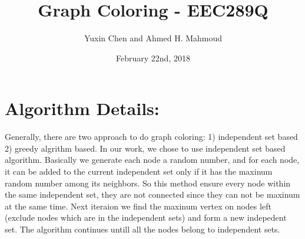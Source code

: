 \documentclass[12pt] {article}
\begin{document}
\title{Graph Coloring -  EEC289Q}
\author{Yuxin Chen and Ahmed H. Mahmoud}
\date{February 22nd, 2018}
\maketitle

\section{Algorithm Details:}
Generally, there are two approach to do graph coloring: 1) independent set based 2) greedy algrithm based. In our work, we chose to use independent set based algorithm. Basically we generate each node a random number, and for each node, it can be added to the current independent set only if it has the maxinum random number among its neighbors. So this method ensure every node within the same independent set, they are not connected since they can not be maxinum at the same time. Next iteraion we find the maxinum vertex on nodes left (exclude nodes which are in the independent sets) and form a new indepedent set. The algorithm continues untill all the nodes belong to independent sets.
\end{document}
